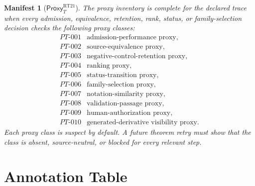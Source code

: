 \documentclass[11pt]{article}
\newcommand{\ProxyT}{\mathsf{Proxy}_{T}}
\newtheorem{manifest}{Manifest}
\begin{document}
\begin{manifest}[\(\ProxyT^{\mathrm{RT21}}\)]
The proxy inventory is complete for the declared trace when every admission,
equivalence, retention, rank, status, or family-selection decision checks
the following proxy classes:
\[
\begin{array}{ll}
PT\text{-}001 & \text{admission-performance proxy},\\
PT\text{-}002 & \text{source-equivalence proxy},\\
PT\text{-}003 & \text{negative-control-retention proxy},\\
PT\text{-}004 & \text{ranking proxy},\\
PT\text{-}005 & \text{status-transition proxy},\\
PT\text{-}006 & \text{family-selection proxy},\\
PT\text{-}007 & \text{notation-similarity proxy},\\
PT\text{-}008 & \text{validation-passage proxy},\\
PT\text{-}009 & \text{human-authorization proxy},\\
PT\text{-}010 & \text{generated-derivative visibility proxy}.
\end{array}
\]
Each proxy class is suspect by default. A future theorem retry must show that
the class is absent, source-neutral, or blocked for every relevant step.
\end{manifest}

\section{Annotation Table}
\end{document}

